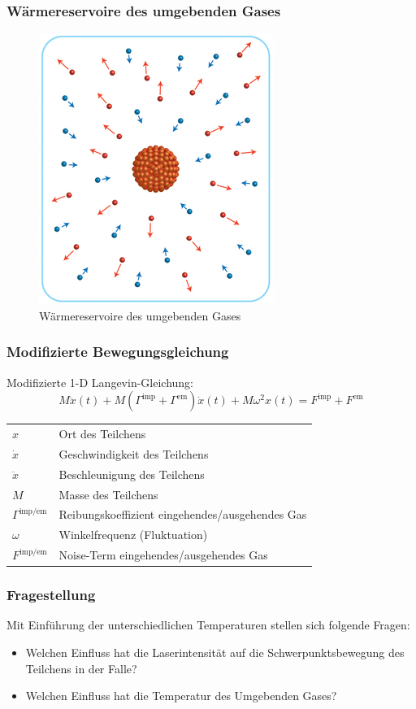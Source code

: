 \documentclass{beamer}
\begin{document}
\begin{frame}
\frametitle{Wärmereservoire des umgebenden Gases}
\begin{center}
\begin{figure}
\includegraphics[scale=0.4]{../images/nano_nonequilibrium_cropped.jpg}
\caption{Wärmereservoire des umgebenden Gases \cite{Kroy2014}}
\end{figure}
\end{center}
\end{frame}


\begin{frame}
\frametitle{Modifizierte Bewegungsgleichung}
Modifizierte 1-D Langevin-Gleichung:
\begin{equation}
    M\ddot{x}(t) + M\left(\Gamma^\text{imp}+\Gamma^\text{em}\right)\dot{x}(t) + M\omega^2x(t) =F^\text{imp}+F^\text{em}
\end{equation}
\begin{tabular}{l l}
$x$ & Ort des Teilchens\\
$\dot{x}$ & Geschwindigkeit des Teilchens\\
$\ddot{x}$ & Beschleunigung des Teilchens\\
$M$ & Masse des Teilchens\\
$\Gamma^\text{imp/em}$ & Reibungskoeffizient eingehendes/ausgehendes Gas\\
$\omega$ & Winkelfrequenz (Fluktuation)\\
$F^\text{imp/em}$ & Noise-Term eingehendes/ausgehendes Gas
\end{tabular}
\end{frame}

\begin{frame}
\frametitle{Fragestellung}
Mit Einführung der unterschiedlichen Temperaturen stellen sich folgende Fragen:
\begin{itemize}
\item Welchen Einfluss hat die Laserintensität auf die Schwerpunktsbewegung des Teilchens in der Falle?
\item Welchen Einfluss hat die Temperatur des Umgebenden Gases?
\end{itemize}
\end{frame}
\end{document}
